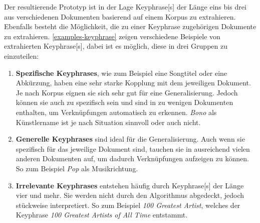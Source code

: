 Der resultierende Prototyp ist in der Lage \gls{Keyphrase}[s] der Länge eins bis drei aus verschiedenen Dokumenten basierend auf einem Korpus zu extrahieren. Ebenfalls besteht die Möglichkeit, die zu einer \gls{Keyphrase} zugehörigen Dokumente zu extrahieren. \autoref{examples-keyphrase} zeigen verschiedene Beispiele von extrahierten \gls{Keyphrase}[s], dabei ist es möglich, diese in drei Gruppen zu einzuteilen:
\begin{enumerate}
    \item \textbf{Spezifische Keyphrases}, wie zum Beispiel eine Songtitel oder eine Abkürzung, haben eine sehr starke Kopplung mit dem jeweiligen Dokument. Je nach Korpus eignen sie sich sehr gut für eine Generalisierung. Jedoch können sie auch zu spezifisch sein und sind in zu wenigen Dokumenten enthalten, um Verknüpfungen automatisch zu erkennen. \textit{Bono} als Künstlername ist je nach Situation sinnvoll oder auch nicht.
    \item \textbf{Generelle Keyphrases} sind ideal für die Generalisierung. Auch wenn sie spezifisch für das jeweilige Dokument sind, tauchen sie in ausreichend vielen anderen Dokumenten auf, um dadurch Verknüpfungen aufzeigen zu können. So zum Beispiel \textit{Pop} als Musikrichtung.
    \item \textbf{Irrelevante Keyphrases} entstehen häufig durch \gls{Keyphrase}[s] der Länge vier und mehr. Sie werden nicht durch den Algorithmus abgedeckt, jedoch stückweise interpretiert. So zum Beispiel \textit{100 Greatest Artist}, welches der \gls{Keyphrase} \textit{100 Greatest Artists of All Time} entstammt.
\end{enumerate}




